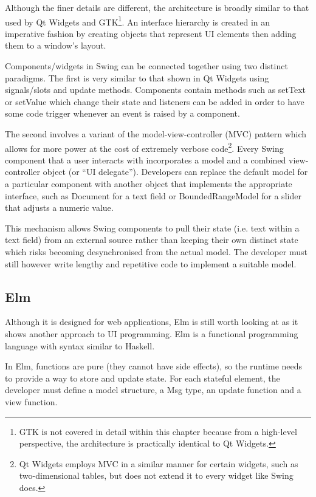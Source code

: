 \documentclass[11pt]{report}
\begin{document}
Although the finer details are different, the architecture is broadly similar to that used by Qt Widgets and GTK\footnote{GTK is not covered in detail within this chapter because from a high-level perspective, the architecture is practically identical to Qt Widgets.}. An interface hierarchy is created in an imperative fashion by creating objects that represent UI elements then adding them to a window's layout.

Components/widgets in Swing can be connected together using two distinct paradigms. The first is very similar to that shown in Qt Widgets using signals/slots and update methods. Components contain methods such as setText or setValue which change their state and listeners can be added in order to have some code trigger whenever an event is raised by a component.

The second involves a variant of the model-view-controller (MVC) pattern which allows for more power at the cost of extremely verbose code\footnote{Qt Widgets employs MVC in a similar manner for certain widgets, such as two-dimensional tables, but does not extend it to every widget like Swing does.\cite{QtMVC}}. Every Swing component that a user interacts with incorporates a model and a combined view-controller object (or “UI delegate”)\cite{SwingArchitecture}. Developers can replace the default model for a particular component with another object that implements the appropriate interface, such as Document for a text field or BoundedRangeModel for a slider that adjusts a numeric value.

This mechanism allows Swing components to pull their state (i.e. text within a text field) from an external source rather than keeping their own distinct state which risks becoming desynchronised from the actual model. The developer must still however write lengthy and repetitive code to implement a suitable model.

\subsection{Elm} \label{secElm}

Although it is designed for web applications, Elm\cite{elm} is still worth looking at as it shows another approach to UI programming. Elm is a functional programming language with syntax similar to Haskell.

In Elm, functions are pure (they cannot have side effects), so the runtime needs to provide a way to store and update state. For each stateful element, the developer must define a model structure, a Msg type, an update function and a view function.
\end{document}
